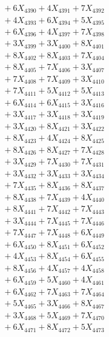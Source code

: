 \documentclass[a4paper,10pt]{article}
\begin{document}
{\begin{align}
&\;  + 6 X_{4390} + 4 X_{4391} + 7 X_{4392} \\[0.3ex]
&\;  + 4 X_{4393} + 6 X_{4394} + 5 X_{4395} \\[0.3ex]
&\;  + 6 X_{4396} + 4 X_{4397} + 7 X_{4398} \\[0.3ex]
&\;  + 3 X_{4399} + 3 X_{4400} + 8 X_{4401} \\[0.3ex]
&\;  + 8 X_{4402} + 8 X_{4403} + 7 X_{4404} \\[0.3ex]
&\;  + 8 X_{4405} + 7 X_{4406} + 3 X_{4407} \\[0.3ex]
&\;  + 7 X_{4408} + 7 X_{4409} + 3 X_{4410} \\[0.3ex]
&\;  + 7 X_{4411} + 5 X_{4412} + 5 X_{4413} \\[0.3ex]
&\;  + 6 X_{4414} + 6 X_{4415} + 3 X_{4416} \\[0.3ex]
&\;  + 3 X_{4417} + 3 X_{4418} + 3 X_{4419} \\[0.5ex]\allowbreak
&\;  + 3 X_{4420} + 8 X_{4421} + 3 X_{4422} \\[0.3ex]
&\;  + 8 X_{4423} + 4 X_{4424} + 8 X_{4425} \\[0.3ex]
&\;  + 8 X_{4426} + 8 X_{4427} + 7 X_{4428} \\[0.3ex]
&\;  + 3 X_{4429} + 7 X_{4430} + 7 X_{4431} \\[0.3ex]
&\;  + 3 X_{4432} + 3 X_{4433} + 3 X_{4434} \\[0.3ex]
&\;  + 7 X_{4435} + 8 X_{4436} + 8 X_{4437} \\[0.3ex]
&\;  + 8 X_{4438} + 7 X_{4439} + 4 X_{4440} \\[0.3ex]
&\;  + 8 X_{4441} + 7 X_{4442} + 7 X_{4443} \\[0.3ex]
&\;  + 3 X_{4444} + 7 X_{4445} + 7 X_{4446} \\[0.3ex]
&\;  + 7 X_{4447} + 7 X_{4448} + 6 X_{4449} \\[0.5ex]\allowbreak
&\;  + 6 X_{4450} + 8 X_{4451} + 6 X_{4452} \\[0.3ex]
&\;  + 4 X_{4453} + 8 X_{4454} + 6 X_{4455} \\[0.3ex]
&\;  + 8 X_{4456} + 4 X_{4457} + 4 X_{4458} \\[0.3ex]
&\;  + 6 X_{4459} + 5 X_{4460} + 4 X_{4461} \\[0.3ex]
&\;  + 6 X_{4462} + 7 X_{4463} + 7 X_{4464} \\[0.3ex]
&\;  + 5 X_{4465} + 3 X_{4466} + 8 X_{4467} \\[0.3ex]
&\;  + 3 X_{4468} + 5 X_{4469} + 7 X_{4470} \\[0.3ex]
&\;  + 6 X_{4471} + 8 X_{4472} + 5 X_{4473} \\[0.3ex]

\end{align}}
\end{document}
